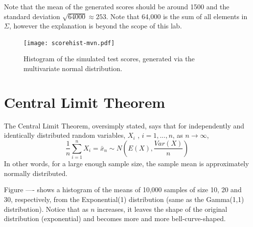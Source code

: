 Note that the mean of the generated scores should be around 1500 and the standard deviation $\sqrt{64000} \approx 253$. 
Note that 64,000 is the sum of all elements in $\Sigma$, however the explanation is beyond the scope of this lab. 

\begin{figure}[h]
\centering
\texttt{[image: scorehist-mvn.pdf]}
\caption{Histogram of the simulated test scores, generated via the multivariate normal distribution.}
\end{figure}


\section*{Central Limit Theorem}

The Central Limit Theorem, oversimply stated, says that for independently and identically distributed random variables, $X_i$ , $i = 1, ..., n$, as $n \rightarrow \infty$,
\[ 
\frac{1}{n} \sum^n_{i=1} X_i = \bar{x}_n \sim N\left(E(X), \frac{Var(X)}{n}\right)
\]
In other words, for a large enough sample size, the sample mean is approximately normally distributed. 

Figure ---- shows a histogram of the means of 10,000 samples of size 10, 20 and 30, respectively, from the Exponential(1) distribution (same as the Gamma(1,1) distribution). Notice that as $n$ increases, it leaves the shape of the original distribution (exponential) and becomes more and more bell-curve-shaped. 

